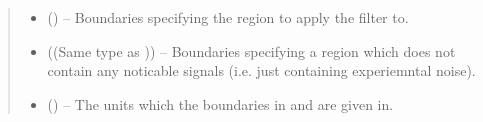 \documentclass[letterpaper,10pt,english]{sphinxmanual}
\begin{document}
\begin{fulllineitems}
\begin{quote}
\begin{description}
\begin{itemize}
\item {} 
\sphinxAtStartPar
{} (\sphinxstyleliteralemphasis{\sphinxupquote{{[}}}\sphinxstyleliteralemphasis{\sphinxupquote{{[}}}\sphinxstyleliteralemphasis{\sphinxupquote{, }}\sphinxstyleliteralemphasis{\sphinxupquote{{]}}}\sphinxstyleliteralemphasis{\sphinxupquote{{]}}}\sphinxstyleliteralemphasis{\sphinxupquote{, }}\sphinxstyleliteralemphasis{\sphinxupquote{{[}}}\sphinxstyleliteralemphasis{\sphinxupquote{{[}}}\sphinxstyleliteralemphasis{\sphinxupquote{, }}\sphinxstyleliteralemphasis{\sphinxupquote{{]}}}\sphinxstyleliteralemphasis{\sphinxupquote{{]}}}\sphinxstyleliteralemphasis{\sphinxupquote{, }}\sphinxstyleliteralemphasis{\sphinxupquote{{[}}}\sphinxstyleliteralemphasis{\sphinxupquote{{[}}}\sphinxstyleliteralemphasis{\sphinxupquote{, }}\sphinxstyleliteralemphasis{\sphinxupquote{{]}}}\sphinxstyleliteralemphasis{\sphinxupquote{, }}\sphinxstyleliteralemphasis{\sphinxupquote{{[}}}\sphinxstyleliteralemphasis{\sphinxupquote{, }}\sphinxstyleliteralemphasis{\sphinxupquote{{]}}}\sphinxstyleliteralemphasis{\sphinxupquote{{]} or    }}\sphinxstyleliteralemphasis{\sphinxupquote{{[}}}\sphinxstyleliteralemphasis{\sphinxupquote{{[}}}\sphinxstyleliteralemphasis{\sphinxupquote{, }}\sphinxstyleliteralemphasis{\sphinxupquote{{]}}}\sphinxstyleliteralemphasis{\sphinxupquote{, }}\sphinxstyleliteralemphasis{\sphinxupquote{{[}}}\sphinxstyleliteralemphasis{\sphinxupquote{, }}\sphinxstyleliteralemphasis{\sphinxupquote{{]}}}\sphinxstyleliteralemphasis{\sphinxupquote{{]}}}) – Boundaries specifying the region to apply the filter to.

\item {} 
\sphinxAtStartPar
{} ((Same type as )) – Boundaries specifying a region which does not contain any noticable
signals (i.e. just containing experiemntal noise).

\item {} 
\sphinxAtStartPar
{} (\sphinxstyleliteralemphasis{\sphinxupquote{, }}\sphinxstyleliteralemphasis{\sphinxupquote{, }}) – The units which the boundaries in  and  are
given in.


\end{itemize}
\end{description}
\end{quote}
\end{fulllineitems}
\end{document}
